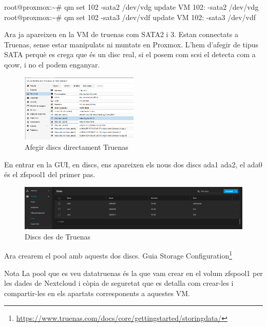 \documentclass[
  10pt,
]{krantz}
\newenvironment{Shaded}{\begin{snugshade}}{\end{snugshade}}
\newcommand{\AttributeTok}[1]{\textcolor[rgb]{0.77,0.63,0.00}{#1}}
\newcommand{\ExtensionTok}[1]{#1}
\newcommand{\NormalTok}[1]{#1}
\DeclareRobustCommand{\href}[2]{#2\footnote{\url{#1}}}
\begin{document}
\begin{Shaded}
\begin{Highlighting}[]
\ExtensionTok{root@proxmox:\textasciitilde{}\#}\NormalTok{ qm set  102  }\AttributeTok{{-}sata2}\NormalTok{ /dev/vdg}
\ExtensionTok{update}\NormalTok{ VM 102: }\AttributeTok{{-}sata2}\NormalTok{ /dev/vdg}
\ExtensionTok{root@proxmox:\textasciitilde{}\#}\NormalTok{ qm set  102  }\AttributeTok{{-}sata3}\NormalTok{ /dev/vdf}
\ExtensionTok{update}\NormalTok{ VM 102: }\AttributeTok{{-}sata3}\NormalTok{ /dev/vdf}
\end{Highlighting}
\end{Shaded}

Ara ja apareixen en la VM de truenas com SATA2 i 3. Estan connectats a Truenas, sense estar manipulats ni muntats en Proxmox. L'hem d'afegir de tipus SATA perquè es crega que és un disc real, si el posem com scsi el detecta com a qcow, i no el podem enganyar.

\begin{figure}
\centering
\includegraphics[width=0.5\textwidth,height=\textheight]{imatges/proxmox/trunas_disc_fg.png}
\caption{Afegir discs directament Truenas}
\end{figure}

En entrar en la GUI, en discs, ens apareixen els nous dos discs ada1 ada2, el ada0 és el zfspool1 del primer pas.

\begin{figure}
\centering
\includegraphics{imatges/proxmox/true_da0.png}
\caption{Discs des de Truenas}
\end{figure}

Ara crearem el pool amb aquests dos discs. Guia \href{https://www.truenas.com/docs/core/gettingstarted/storingdata/}{Storage Configuration}

\begin{rmdnote}{Nota}
La pool que es veu datatruenas és la que vam crear en el volum zfspool1 per les dades de Nextcloud i còpia de seguretat que es detalla com crear-les i compartir-les en els apartats corresponents a aquestes VM.

\end{rmdnote}
\end{document}
